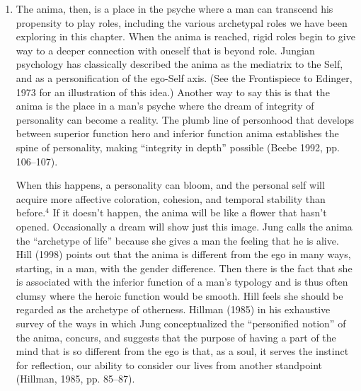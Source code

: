 \begin{enumerate}
It seemed clear to us both that locating his ‘old lady,’ the anima figure that
represented his reality, had exploded the hipster pretensions of the fictitious
persona he had been hiding behind to make himself more glamorous. Not long
after these dreams, my patient began to engage seriously and no longer
theoretically with his homosexuality and to talk about how he wanted to live
that. He had a dream that his and another man’s bodies fitted perfectly
together, and it was clear to him that if he found the suitable partner he
would be entirely comfortable in a homosexual partnership. Not long after this
was clear, he felt ready to terminate. He had a final dream in which he
suffered an injury, called for a medic, and got his wound healed. A follow-up
contact nearly 15 years later revealed that shortly after terminating with me,
he entered into a long-term love relationship with a man that had lasted over a
decade, followed by a break up, and now, he told me, he was in another
long-term relationship with a man that seemed destined to last even longer. He
was clearly comfortable with his life.

\item {} The anima, then, is a place in the
psyche where a man can transcend his propensity to play roles, including the
various archetypal roles we have been exploring in this chapter. When the anima
is reached, rigid roles begin to give way to a deeper connection with oneself
that is beyond role. Jungian psychology has classically described the anima as
the mediatrix to the Self, and as a personification of the ego-Self axis. (See
the Frontispiece to Edinger, 1973 for an illustration of this idea.) Another
way to say this is that the anima is the place in a man’s psyche where the
dream of integrity of personality can become a reality. The plumb line of
personhood that develops between superior function hero and inferior function
anima establishes the spine of personality, making “integrity in depth”
possible (Beebe 1992, pp. 106–107).

When this happens, a personality can bloom, and the personal self will acquire
more affective coloration, cohesion, and temporal stability than before.$^4$ If
it doesn’t happen, the anima will be like a flower that hasn’t opened.
Occasionally a dream will show just this image. Jung calls the anima the
“archetype of life” because she gives a man the feeling that he is alive. Hill
(1998) points out that the anima is different from the ego in many ways,
starting, in a man, with the gender difference. Then there is the fact that she
is associated with the inferior function of a man’s typology and is thus often
clumsy where the heroic function would be smooth. Hill feels she should be
regarded as the archetype of otherness. Hillman (1985) in his exhaustive survey
of the ways in which Jung conceptualized the “personified notion” of the anima,
concurs, and suggests that the purpose of having a part of the mind that is so
different from the ego is that, as a soul, it serves the instinct for
reflection, our ability to consider our lives from another standpoint (Hillman,
1985, pp. 85–87).


\end{enumerate}
